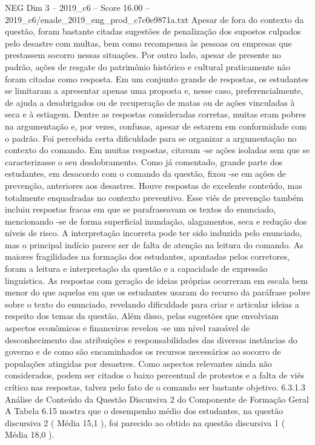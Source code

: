 \begin{textsample}{NEG Dim 3 – 2019\_c6 – Score 16.00 – 2019\_c6/enade\_2019\_eng\_prod\_c7c0e9871a.txt}
Apesar de fora do contexto da questão, foram bastante citadas sugestões de penalização dos supostos culpados pelo desastre com multas, bem como recompensa às pessoas ou empresas que prestassem socorro nessas situações.
Por outro lado, apesar de presente no padrão, ações de resgate do patrimônio histórico e cultural praticamente não foram citadas como resposta.
Em um conjunto grande de respostas, os estudantes se limitaram a apresentar apenas uma proposta e, nesse caso, preferencialmente, de ajuda a desabrigados ou de recuperação de matas ou de ações vinculadas à seca e à estiagem.
Dentre as respostas consideradas corretas, muitas eram pobres na argumentação e, por vezes, confusas, apesar de estarem em conformidade com o padrão.
Foi percebida certa dificuldade para se organizar a argumentação no contexto do comando.
Em muitas respostas, citavam -se ações isoladas sem que se caracterizasse o seu desdobramento.
Como já comentado, grande parte dos estudantes, em desacordo com o comando da questão, fixou -se em ações de prevenção, anteriores aos desastres.
Houve respostas de excelente conteúdo, mas totalmente enquadradas no contexto preventivo.
Esse viés de prevenção também incluiu respostas fracas em que se parafraseavam os textos do enunciado, mencionando -se de forma superficial inundação, alagamentos, seca e redução dos níveis de risco.
A interpretação incorreta pode ter sido induzida pelo enunciado, mas o principal indício parece ser de falta de atenção na leitura do comando.
As maiores fragilidades na formação dos estudantes, apontadas pelos corretores, foram a leitura e interpretação da questão e a capacidade de expressão linguística.
As respostas com geração de ideias próprias ocorreram em escala bem menor do que aquelas em que os estudantes usaram do recurso da paráfrase pobre sobre o texto do enunciado, revelando dificuldade para criar e articular ideias a respeito dos temas da questão.
Além disso, pelas sugestões que envolviam aspectos econômicos e financeiros revelou -se um nível razoável de desconhecimento das atribuições e responsabilidades das diversas instâncias do governo e de como são encaminhados os recursos necessários ao socorro de populações atingidas por desastres.
Como aspectos relevantes ainda não considerados, podem ser citados o baixo percentual de protestos e a falta de viés crítico nas respostas, talvez pelo fato de o comando ser bastante objetivo. 6.3.1.3 Análise de Conteúdo da Questão Discursiva 2 do Componente de Formação Geral A Tabela 6.15 mostra que o desempenho médio dos estudantes, na questão discursiva 2 ( Média 15,1 ), foi parecido ao obtido na questão discursiva 1 ( Média 18,0 ).

\end{textsample}
